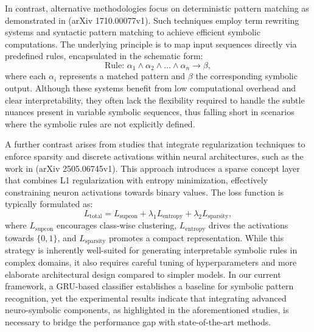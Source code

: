 \documentclass[12pt]{article}
\begin{document}
In contrast, alternative methodologies focus on deterministic pattern matching as demonstrated in (arXiv 1710.00077v1). Such techniques employ term rewriting systems and syntactic pattern matching to achieve efficient symbolic computations. The underlying principle is to map input sequences directly via predefined rules, encapsulated in the schematic form:
\[
\text{Rule: } \alpha_1 \land \alpha_2 \land \dots \land \alpha_n \to \beta,
\]
where each \(\alpha_i\) represents a matched pattern and \(\beta\) the corresponding symbolic output. Although these systems benefit from low computational overhead and clear interpretability, they often lack the flexibility required to handle the subtle nuances present in variable symbolic sequences, thus falling short in scenarios where the symbolic rules are not explicitly defined.

A further contrast arises from studies that integrate regularization techniques to enforce sparsity and discrete activations within neural architectures, such as the work in (arXiv 2505.06745v1). This approach introduces a sparse concept layer that combines L1 regularization with entropy minimization, effectively constraining neuron activations towards binary values. The loss function is typically formulated as:
\[
L_{\text{total}} = L_{\text{supcon}} + \lambda_1 L_{\text{entropy}} + \lambda_2 L_{\text{sparsity}},
\]
where \(L_{\text{supcon}}\) encourages class-wise clustering, \(L_{\text{entropy}}\) drives the activations towards \(\{0,1\}\), and \(L_{\text{sparsity}}\) promotes a compact representation. While this strategy is inherently well-suited for generating interpretable symbolic rules in complex domains, it also requires careful tuning of hyperparameters and more elaborate architectural design compared to simpler models. In our current framework, a GRU-based classifier establishes a baseline for symbolic pattern recognition, yet the experimental results indicate that integrating advanced neuro-symbolic components, as highlighted in the aforementioned studies, is necessary to bridge the performance gap with state-of-the-art methods.
\end{document}
